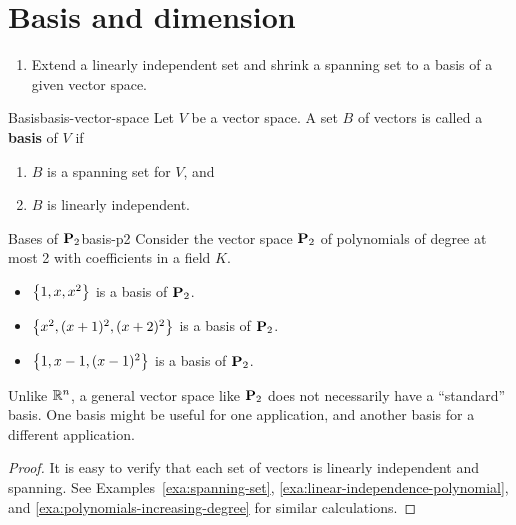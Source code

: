 \section{Basis and dimension}

\begin{outcome}
  \begin{enumerate}
  \item Extend a linearly independent set and shrink a spanning set to
    a basis of a given vector space.
  \end{enumerate}
\end{outcome}

\begin{definition}{Basis}{basis-vector-space}
  Let $V$ be a vector space. A set $B$ of vectors is called a
  \textbf{basis}%
   of $V$ if
  \begin{enumerate}
  \item $B$ is a spanning set for $V$, and
  \item $B$ is linearly independent.
  \end{enumerate}
\end{definition}

\begin{example}{Bases of $\mathbf{P}_2$}{basis-p2}
  Consider the vector space $\mathbf{P}_2$ of polynomials of degree at most
  2 with coefficients in a field $K$.%
  \begin{itemize}
  \item $\left\{1, x, x^2\right\}$ is a basis of $\mathbf{P}_2$.
  \item $\left\{x^2, (x+1)^2, (x+2)^2\right\}$ is a basis of $\mathbf{P}_2$.
  \item $\left\{1, x-1, (x-1)^2\right\}$ is a basis of $\mathbf{P}_2$.
  \end{itemize}
  Unlike $\mathbb{R}^n$, a general vector space like $\mathbf{P}_2$ does not
  necessarily have a ``standard'' basis. One basis might be useful for
  one application, and another basis for a different application.
\end{example}

\begin{proof}
  It is easy to verify that each set of vectors is linearly
  independent and spanning. See Examples~\ref{exa:spanning-set},
  {\ref{exa:linear-independence-polynomial}}, and
  {\ref{exa:polynomials-increasing-degree}} for similar calculations.
\end{proof}

